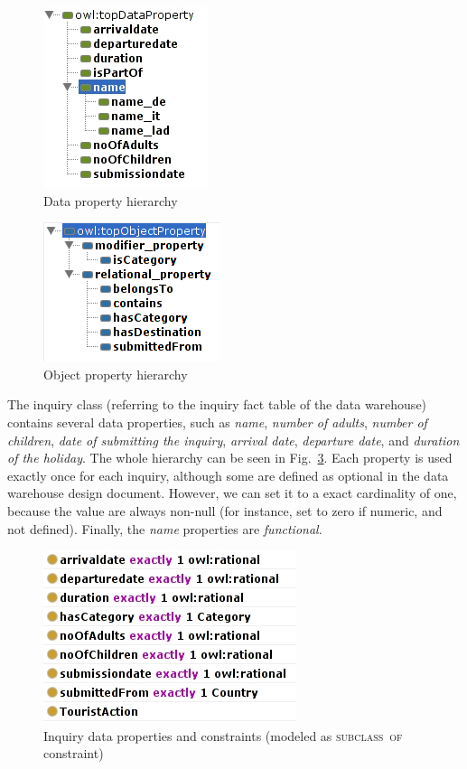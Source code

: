 \begin{figure}[h]
\centering
\includegraphics[width=0.3\linewidth]{img/data_property_hierarchy}
\caption{Data property hierarchy}
\label{fig:data_property_hierarchy}
\end{figure}

\begin{figure}[h]
\centering
\includegraphics[width=0.3\linewidth]{img/object_property_hierarchy}
\caption{Object property hierarchy}
\label{fig:object_property_hierarchy}
\end{figure}

The inquiry class (referring to the inquiry fact table of the data warehouse) contains several data properties, such as \textit{name}, \textit{number of adults}, \textit{number of children}, \textit{date of submitting the inquiry}, \textit{arrival date}, \textit{departure date}, and \textit{duration of the holiday}. The whole hierarchy can be seen in Fig.~\ref{fig:class_inquiry_properties}. Each property is used exactly once for each inquiry, although some are defined as optional in the data warehouse design document. However, we can set it to a exact cardinality of one, because the value are always non-null (for instance, set to zero if numeric, and not defined). Finally, the \textit{name} properties are \textit{functional}.

\begin{figure}[h]
\centering
\includegraphics[width=0.4\linewidth]{img/class_inquiry_properties}
\caption{Inquiry data properties and constraints (modeled as \textsc{subclass~of} constraint)}
\label{fig:class_inquiry_properties}
\end{figure}

